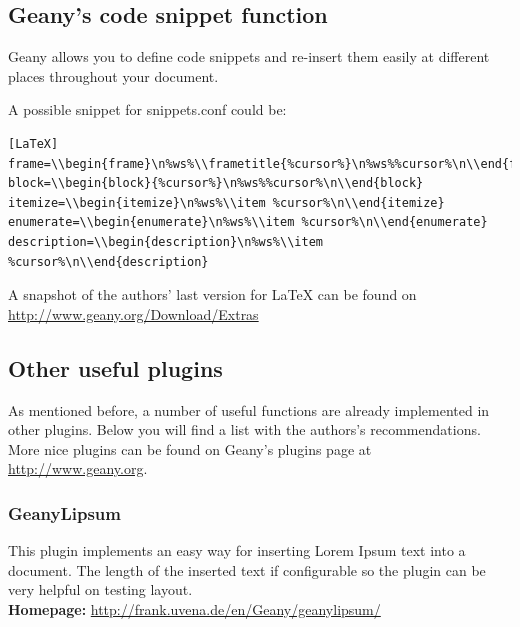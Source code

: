 \documentclass[%
paper=a4,%
fontsize=11pt,%
twoside=false,%
DIV18,%
headsepline,%
plainheadsepline,%
footsepline,%
plainfootsepline,%
bibliography=totoc,%
listof=totoc,%
BCOR10mm,%
parskip=half,%
openany,%
]{scrartcl}
\begin{document}
\subsection{Geany's code snippet function}
Geany allows you to define code snippets and re-insert them easily
at different places throughout your document.

A possible snippet for snippets.conf could be:

\begin{lstlisting}[caption={Minimal snippets.conf for \LaTeX{}}]
[LaTeX]
frame=\\begin{frame}\n%ws%\\frametitle{%cursor%}\n%ws%%cursor%\n\\end{frame}
block=\\begin{block}{%cursor%}\n%ws%%cursor%\n\\end{block}
itemize=\\begin{itemize}\n%ws%\\item %cursor%\n\\end{itemize}
enumerate=\\begin{enumerate}\n%ws%\\item %cursor%\n\\end{enumerate}
description=\\begin{description}\n%ws%\\item %cursor%\n\\end{description}
\end{lstlisting}

A snapshot of the authors' last version for LaTeX can be found on
\url{http://www.geany.org/Download/Extras}

\subsection{Other useful plugins}
As mentioned before, a number of useful functions are already
implemented in other plugins. Below you will find a list with the
authors's recommendations. More nice plugins can be found on Geany's
plugins page at \url{http://www.geany.org}.

\subsubsection{GeanyLipsum}
This plugin implements an easy way for inserting Lorem Ipsum text into
a document. The length of the inserted text if configurable so the
plugin can be very helpful on testing layout.\\
\textbf{Homepage:} \url{http://frank.uvena.de/en/Geany/geanylipsum/}
\end{document}
